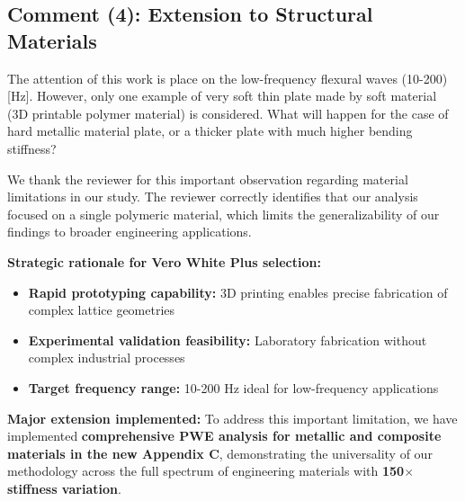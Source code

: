 \documentclass[11pt,a4paper]{article}
\newenvironment{reviewerbox}{%
    \par\medskip\noindent{\color{reviewercolor}\rule{\linewidth}{2pt}}\par
    \noindent{\color{reviewercolor}\bfseries Reviewer Comment}\par\smallskip
}{%
    \par\noindent{\color{reviewercolor}\rule{\linewidth}{0.5pt}}\medskip
}
\newenvironment{responsebox}{%
    \par\medskip\noindent{\color{responsecolor}\rule{\linewidth}{2pt}}\par
    \noindent{\color{responsecolor}\bfseries Response}\par\smallskip
}{%
    \par\noindent{\color{responsecolor}\rule{\linewidth}{0.5pt}}\medskip
}
\begin{document}
\newpage

\subsection*{Comment (4): Extension to Structural Materials}

\begin{reviewerbox}
The attention of this work is place on the low-frequency flexural waves (10-200)[Hz]. However, only one example of very soft thin plate made by soft material (3D printable polymer material) is considered. What will happen for the case of hard metallic material plate, or a thicker plate with much higher bending stiffness?
\end{reviewerbox}

\begin{responsebox}
We thank the reviewer for this important observation regarding material limitations in our study. The reviewer correctly identifies that our analysis focused on a single polymeric material, which limits the generalizability of our findings to broader engineering applications.

\textbf{Strategic rationale for Vero White Plus selection:}
\begin{itemize}
    \item \textbf{Rapid prototyping capability:} 3D printing enables precise fabrication of complex lattice geometries
    \item \textbf{Experimental validation feasibility:} Laboratory fabrication without complex industrial processes
    \item \textbf{Target frequency range:} 10-200 Hz ideal for low-frequency applications
\end{itemize}

\textbf{Major extension implemented:} To address this important limitation, we have implemented \textbf{comprehensive PWE analysis for metallic and composite materials in the new Appendix C}, demonstrating the universality of our methodology across the full spectrum of engineering materials with \textbf{150$\times$ stiffness variation}.
\end{responsebox}
\end{document}
